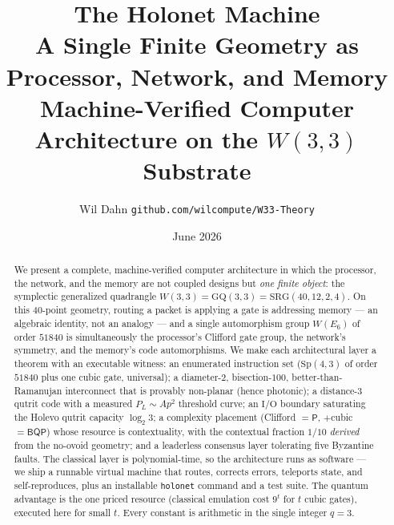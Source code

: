 \documentclass[11pt]{article}
\title{\vspace{-1.5em}\textbf{\color{RoyalBlue}\LARGE The Holonet Machine}\\[0.3em]
{\large A Single Finite Geometry as Processor, Network, and Memory}\\[0.2em]
{\normalsize Machine-Verified Computer Architecture on the $W(3,3)$ Substrate}}
\author{Wil Dahn \quad\textbar\quad \texttt{github.com/wilcompute/W33-Theory}}
\date{June 2026}
\begin{document}
\maketitle

\begin{abstract}
\noindent We present a complete, machine-verified computer architecture in which the processor, the
network, and the memory are not coupled designs but \emph{one finite object}: the symplectic generalized
quadrangle $W(3,3)=\mathrm{GQ}(3,3)=\mathrm{SRG}(40,12,2,4)$. On this $40$-point geometry, routing a
packet is applying a gate is addressing memory --- an algebraic identity, not an analogy --- and a
single automorphism group $W(E_6)$ of order $51840$ is simultaneously the processor's Clifford gate
group, the network's symmetry, and the memory's code automorphisms. We make each architectural layer a
theorem with an executable witness: an enumerated instruction set ($\mathrm{Sp}(4,3)$ of order
$51840$ plus one cubic gate, universal); a diameter-$2$, bisection-$100$, better-than-Ramanujan
interconnect that is provably non-planar (hence photonic); a distance-$3$ qutrit code with a measured
$P_L\sim A p^2$ threshold curve; an $\mathrm{I/O}$ boundary saturating the Holevo qutrit capacity
$\log_2 3$; a complexity placement (Clifford $=\mathsf{P}$, $+$cubic $=\mathsf{BQP}$) whose resource is
contextuality, with the contextual fraction $1/10$ \emph{derived} from the no-ovoid geometry; and a
leaderless consensus layer tolerating five Byzantine faults. The classical layer is polynomial-time, so
the architecture runs as software --- we ship a runnable virtual machine that routes, corrects errors,
teleports state, and self-reproduces, plus an installable \texttt{holonet} command and a test suite.
The quantum advantage is the one priced resource (classical emulation cost $9^t$ for $t$ cubic gates),
executed here for small $t$. Every constant is arithmetic in the single integer $q=3$.
\end{abstract}
\end{document}
